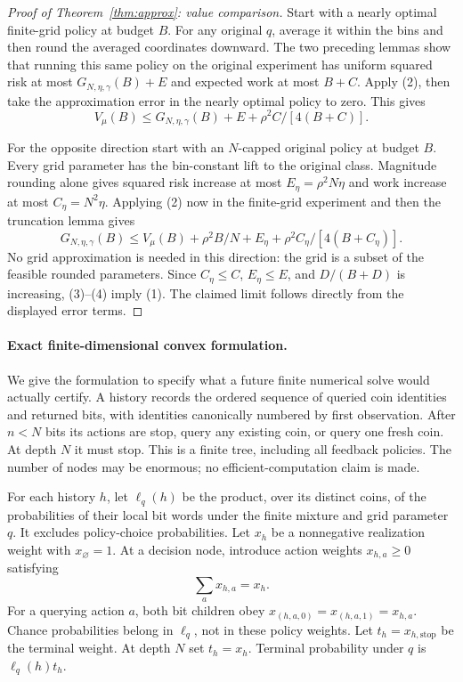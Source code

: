 \documentclass[11pt]{article}
\begin{document}
\begin{proof}[Proof of Theorem~\ref{thm:approx}: value comparison]
Start with a nearly optimal finite-grid policy at budget $B$. For any
original $q$, average it within the bins and then round the averaged
coordinates downward. The two preceding lemmas show that running this same
policy on the original experiment has uniform squared risk at most
$G_{N,\eta,\gamma}(B)+E$ and expected work at most $B+C$. Apply (2), then
take the approximation error in the nearly optimal policy to zero. This gives
\[
 V_\mu(B)\le G_{N,\eta,\gamma}(B)+E+
                         \rho^2C/[4(B+C)].                \tag{3}
\]

For the opposite direction start with an $N$-capped original policy at
budget $B$. Every grid parameter has the bin-constant lift to the original
class. Magnitude rounding alone gives squared risk increase at most
$E_\eta=\rho^2N\eta$ and work increase at most $C_\eta=N^2\eta$.
Applying (2) now in the finite-grid experiment and then the truncation lemma
gives
\[
 G_{N,\eta,\gamma}(B)
 \le V_\mu(B)+\rho^2B/N+E_\eta+
                         \rho^2 C_\eta/[4(B+C_\eta)].      \tag{4}
\]
No grid approximation is needed in this direction: the grid is a subset of
the feasible rounded parameters. Since $C_\eta\le C$, $E_\eta\le E$, and
$D/(B+D)$ is increasing, (3)--(4) imply (1). The claimed limit follows
directly from the displayed error terms.
\end{proof}

\paragraph{Exact finite-dimensional convex formulation.}
We give the formulation to specify what a future finite numerical solve
would actually certify. A history records the ordered sequence of queried
coin identities and returned bits, with identities canonically numbered by
first observation. After $n<N$ bits its actions are stop, query any existing
coin, or query one fresh coin. At depth $N$ it must stop. This is a finite
tree, including all feedback policies. The number of nodes may be enormous;
no efficient-computation claim is made.

For each history $h$, let $\ell_q(h)$ be the product, over its distinct coins,
of the probabilities of their local bit words under the finite mixture and
grid parameter $q$. It excludes policy-choice probabilities. Let $x_h$ be a
nonnegative realization weight with $x_\varnothing=1$. At a decision node,
introduce action weights $x_{h,a}\ge0$ satisfying
\[
 \sum_a x_{h,a}=x_h.
\]
For a querying action $a$, both bit children obey
$x_{(h,a,0)}=x_{(h,a,1)}=x_{h,a}$. Chance probabilities belong in
$\ell_q$, not in these policy weights. Let $t_h=x_{h,\mathrm{stop}}$ be
the terminal weight. At depth $N$ set $t_h=x_h$. Terminal probability under
$q$ is $\ell_q(h)t_h$.
\end{document}
